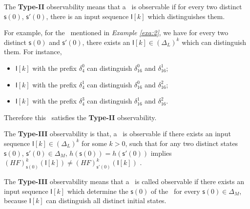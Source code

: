 The {\bf Type-II} observability means that a \BCN\ is observable if for every two distinct $\mathsf{s}(0)$, $\mathsf{s}'(0)$, there is an input sequence $\mathsf{I}[k]$ which distinguishes them. %
\begin{example}
For example, for the \BCN\ mentioned in {\em Example \ref{exa:2}}, we have for every two distinct $\mathsf{s}(0)$ and $\mathsf{s}'(0)$, there exists an $\mathsf{I}[k]\in(\Delta_L)^k$ which can distinguish them.  For instance,
\begin{itemize}
  \item $\mathsf{I}[k]$ with the prefix $\delta_{4}^0$ can distinguish $\delta_{16}^0$ and $\delta_{16}^1$;
  \item $\mathsf{I}[k]$ with the prefix $\delta_{4}^1$ can distinguish $\delta_{16}^0$ and $\delta_{16}^2$;
  \item $\mathsf{I}[k]$ with the prefix $\delta_{4}^3$ can distinguish $\delta_{16}^1$ and $\delta_{16}^2$.
\end{itemize} 
Therefore this \BCN\ satisfies the {\bf Type-II} observability.
\label{exa:5}
\end{example}   
\begin{definition}
The {\bf Type-III} observability is that, a \BCN\ is observable if there exists an input sequence $\mathsf{I}[k]\in(\Delta_L)^k$ for some $k>0$, such that for any two distinct states $\mathsf{s}(0)$, $\mathsf{s}'(0) \in \Delta_M$, $h(\mathsf{s}(0))=h(\mathsf{s}'(0))$ implies $(HF)^k_{\mathsf{s}(0)}(\mathsf{I}[k])\neq (HF)^k_{\mathsf{s}'(0)}(\mathsf{I}[k])$ \cite{Cheng2011Identification}.
\end{definition}

The {\bf Type-III} observability means that a \BCN\ is called observable if there exists an input sequence $\mathsf{I}[k]$ which determine the $\mathsf{s}(0)$ of the \BCN\ for every $\mathsf{s}(0)\in\Delta_M$, because $\mathsf{I}[k]$ can distinguish all distinct initial states.%

